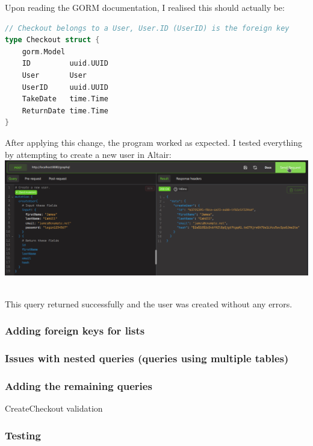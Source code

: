 \documentclass[11pt,a4paper]{article}
\begin{document}
\noindent Upon reading the GORM documentation, I realised this should actually be:

\begin{lstlisting}[language=Go]
// Checkout belongs to a User, User.ID (UserID) is the foreign key
type Checkout struct {
    gorm.Model
    ID         uuid.UUID
    User       User
    UserID     uuid.UUID
    TakeDate   time.Time
    ReturnDate time.Time
}
\end{lstlisting}

\noindent After applying this change, the program worked as expected. I tested everything by attempting to create a new user in Altair:\\

\includegraphics[width=15cm]{implementation/first iteration/postgreproblems altair working.png}

\noindent \\ This query returned successfully and the user was created without any errors.

\subsubsection{Adding foreign keys for lists}

\subsubsection{Issues with nested queries (queries using multiple tables)}

\subsubsection{Adding the remaining queries}

CreateCheckout validation

\subsubsection{Testing}
\end{document}
